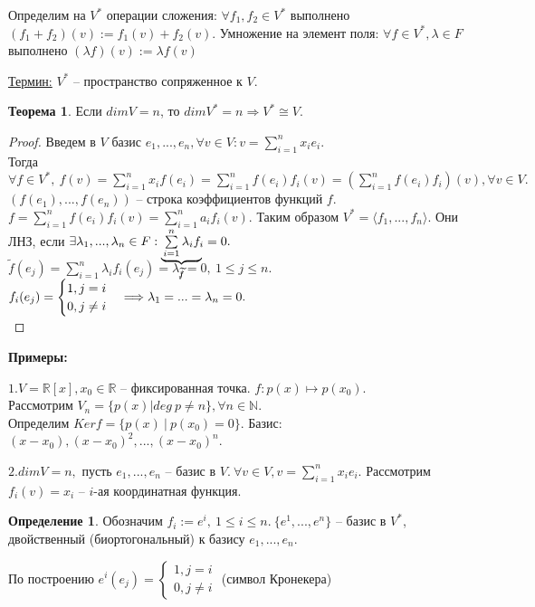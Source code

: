 \documentclass[a4paper, 12pt]{article}
\newcommand\undermat[2]{\makebox[0pt][l]{$\smash{\underbrace
{\phantom{\begin{matrix}#2\end{matrix}}}_{\text{$#1$}}}$}#2}
\theoremstyle{definition}
\newtheorem*{definition}{Определение}
\newtheorem*{theorem}{Теорема}
\begin{document}
    Определим на $V^*$ операции сложения: $\forall f_1, f_2 \in V^*$
    выполнено $(f_1 + f_2)(v) := f_1(v) + f_2(v)$. Умножение на
    элемент поля: $\forall f \in V^*, \lambda \in F$ выполнено
    $(\lambda f)(v) := \lambda f(v)$

    \underline{Термин:} $V^*$ -- пространство сопряженное к $V$.
    \begin{theorem}
        Если $dimV = n$, то $dimV^* = n \Longrightarrow  V^* \cong V$.
    \end{theorem}
    \begin{proof}
        Введем в $V$ базис $e_1,..., e_n, \forall v \in V:
        v = \sum\limits_{i=1}^nx_ie_i.$\\ Тогда $\forall f
        \in V^*,\ f(v) = \sum\limits_{i=1}^nx_if(e_i) =
        \sum\limits_{i=1}^nf(e_i)f_i(v) = (\sum\limits_{i=1}^n
        f(e_i)f_i)(v),\forall v\in V.$
        $(f(e_1),..., f(e_n))$ -- строка коэффициентов функций $f$.
        $f = \sum\limits_{i=1}^nf(e_i)f_i(v) = \sum\limits_{i=1}^n
        a_if_i(v).$ Таким образом $V^* = \langle f_1,..., f_n \rangle$.
        Они ЛНЗ, если $\exists \lambda_1,..., \lambda_n \in F:
        \undermat{\widetilde{f}}{\sum\limits_{i=1}^n\lambda_if_i}  = 0.$\
        $\widetilde{f}(e_j) = \sum\limits_{i=1}^n\lambda_if_i(e_j)
         = \lambda_j = 0,\ 1 \leq j\leq n$.\ 
        $f_i(e_j) = \begin{cases}
            1, j = i\\0, j \neq i
        \end{cases} \Longrightarrow\\\\\\ \lambda_1=...=\lambda_n=0.$\\
    \end{proof}
    \newpage
    \textbf{Примеры:}

    $1. V = \mathbb{R}[x], x_0 \in \mathbb{R}$ -- фиксированная
    точка. $f: p(x) \mapsto p(x_0).$\\
    Рассмотрим $V_n = \{p(x)|deg\ p \neq n\}, \forall n \in \mathbb{N}.$
    \\Определим $Ker f = \{p(x)\ |\ p(x_0) = 0\}$. Базис:
    $(x - x_0), (x-x_0)^2,...,(x-x_0)^n$.

    $2. dimV = n, \text{ пусть } e_1,..., e_n$ -- базис в $V.\
    \forall v \in V, v = \sum\limits_{i=1}^nx_ie_i$.
    Рассмотрим $f_i(v) = x_i$ -- $i$-ая координатная функция.
    \begin{definition}
        Обозначим $f_i := e^i,\ 1 \leq i \leq n.\ \{e^1,...,e^n\}$
        -- базис в $V^*$, двойственный (биортогональный) к базису
        $e_1,..., e_n$.
    \end{definition}
    По построению $e^i(e_j) =
    \begin{cases}1, j = i\\0, j \neq i\end{cases}$
    (символ Кронекера)
\end{document}

